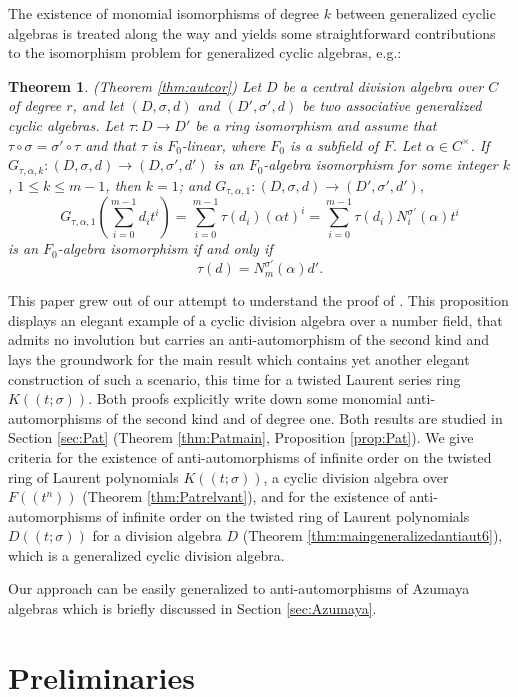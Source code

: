 \documentclass{amsart}
\theoremstyle{plain}
\newtheorem*{theorem*}{Theorem}
\theoremstyle{definition}
\numberwithin{equation}{section}
\numberwithin{figure}{section}
\begin{document}
The existence of monomial isomorphisms of degree $k$ between generalized cyclic algebras is treated along the way and yields some straightforward contributions to the isomorphism problem for generalized cyclic algebras, e.g.:

\begin{theorem*} (Theorem \ref{thm:autcor})
Let $D$ be a central division algebra over $C$ of degree $r$, and let $(D, \sigma, d)$ and $(D', \sigma', d)$ be two associative  generalized cyclic  algebras. Let $\tau:D\to D'$ be a ring isomorphism and assume that $\tau\circ\sigma=\sigma'\circ \tau$ and that $\tau$ is  $F_0$-linear, where $F_0$ is a subfield of $F$. Let  $\alpha\in C^\times$. If $G_{\tau,\alpha,k}:(D, \sigma, d)\to (D, \sigma', d')$  is an $F_0$-algebra isomorphism  for some integer $k$, $1\leq k\leq m-1$, then $k=1$; and
   $ G_{\tau,\alpha,1}:(D, \sigma, d)\to (D', \sigma', d'),$ 
   $$G_{\tau,\alpha,1}(\sum_{i=0}^{m-1}d_it^i)=\sum_{i=0}^{m-1}\tau(d_i) (\alpha t)^i= \sum_{i=0}^{m-1}\tau(d_i) N_i^{\sigma'}(\alpha) t^i $$
    is an $F_0$-algebra isomorphism if and only if
$$\tau(d) =N^{\sigma'}_{m}(\alpha) d'.$$
\end{theorem*}


This paper grew out of our attempt to understand  the proof of \cite[Proposition 3.4]{MST}. This proposition displays an elegant example of a cyclic division algebra over a number field, that admits no involution but carries an anti-automorphism of the second kind and lays the groundwork for the main result \cite[Theorem 4.4]{MST} which contains yet another elegant construction of such a scenario, this time for a twisted Laurent series ring $K((t;\sigma))$. Both proofs explicitly write down some monomial anti-automorphisms of the second kind and of degree one. Both results are studied in Section \ref{sec:Pat}
(Theorem \ref{thm:Patmain}, Proposition \ref{prop:Pat}).
 We give criteria for the existence of anti-automorphisms of infinite order on the twisted ring of Laurent polynomials $K((t;\sigma))$, a cyclic division algebra over $F((t^n))$ (Theorem \ref{thm:Patrelvant}), and for the existence of anti-automorphisms of infinite order on the twisted ring of Laurent polynomials $D((t;\sigma))$ for a division algebra $D$ (Theorem \ref{thm:maingeneralizedantiaut6}), which is a generalized cyclic division algebra.


Our approach can be easily generalized to anti-automorphisms of Azumaya algebras which is briefly discussed in Section \ref{sec:Azumaya}.


\section{Preliminaries}
\end{document}
